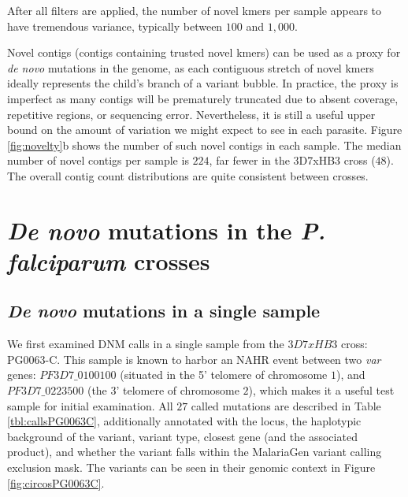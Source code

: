 After all filters are applied, the number of novel kmers per sample appears to have tremendous variance, typically between $100$ and $1,000$.

Novel contigs (contigs containing trusted novel kmers) can be used as a proxy for \textit{de novo} mutations in the genome, as each contiguous stretch of novel kmers ideally represents the child's branch of a variant bubble.  In practice, the proxy is imperfect as many contigs will be prematurely truncated due to absent coverage, repetitive regions, or sequencing error.  Nevertheless, it is still a useful upper bound on the amount of variation we might expect to see in each parasite.  Figure \ref{fig:novelty}b shows the number of such novel contigs in each sample.  The median number of novel contigs per sample is $224$, far fewer in the 3D7xHB3 cross ($48$).  The overall contig count distributions are quite consistent between crosses.

\section{\textit{De novo} mutations in the \textit{P. falciparum} crosses}

\subsection{\textit{De novo} mutations in a single sample}

We first examined DNM calls in a single sample from the $3D7xHB3$ cross: PG0063-C.  This sample is known to harbor an NAHR event between two \textit{var} genes: $PF3D7\_0100100$ (situated in the 5' telomere of chromosome $1$), and $PF3D7\_0223500$ (the 3' telomere of chromosome $2$), which makes it a useful test sample for initial examination.  All $27$ called mutations are described in Table \ref{tbl:callsPG0063C}, additionally annotated with the locus, the haplotypic background of the variant, variant type, closest gene (and the associated product), and whether the variant falls within the MalariaGen variant calling exclusion mask.  The variants can be seen in their genomic context in Figure \ref{fig:circosPG0063C}.  


